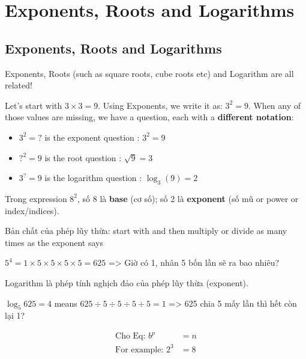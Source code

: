 \chapter{Exponents, Roots and Logarithms}

\section{Exponents, Roots and Logarithms}

Exponents, Roots (such as square roots, cube roots etc) and Logarithm are all related!

Let's start with $3\times 3=9$. Using Exponents, we write it as: $3^{2}=9$. When any of those values are missing, we have a question, each with a \textbf{different notation}:

\begin{itemize}
  \item $3^{2}=?$ is the exponent question : $3^{2}=9$
  \item $?^{2}=9$ is the root question : $\sqrt{9}=3$
  \item $3^{?}=9$ is the logarithm question : $\log_3 (9)=2$
\end{itemize}

\vspace{6 mm}

Trong expression \(8^{2}\), số 8 là \textbf{base} (cơ số); số 2 là \textbf{exponent} (số mũ or power or index/indices).

Bản chất của phép lũy thừa: start with  and then multiply or divide as many times as the exponent says

\(5^{4}= 1 \times 5 \times 5 \times 5 \times 5=625\) => Giờ có 1, nhân 5 bốn lần sẽ ra bao nhiêu?

Logarithm là phép tính nghịch đảo của phép lũy thừa (exponent).

\(\log_5 625=4\) means \(625 \div 5 \div 5 \div 5 \div 5=1\) => 625 chia 5 mấy lần thì hết còn lại 1?

\vspace{6 mm}

\begin{equation*}
  \begin{split}
    \text{Cho Eq: } b^{p}&=n\\
    \text{For example: } 2^{3}&=8
  \end{split}
  \label{exponent_eqn}
\end{equation*}

